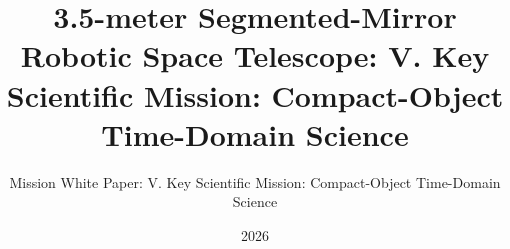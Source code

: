 \newcommand{\wpvolumelabel}{V}
\newcommand{\wpvolumetitle}{Key Scientific Mission: Compact-Object Time-Domain Science}
\title{3.5-meter Segmented-Mirror Robotic Space Telescope: \wpvolumelabel. \wpvolumetitle}
\subtitle{Mission White Paper: \wpvolumelabel. \wpvolumetitle}
\newcommand{\wpauthors}{Juhan Kim$^{1}$, Yong-Woo Kang$^{2}$, Sang Hyun Lee$^{2,3}$, Jeong-Yeol Han$^{2,4}$, Sungwook E. Hong$^{2,4}$, Bongkon Moon$^{2,4}$, Donguk Song$^{2}$, Juhyung Kang$^{2}$, Myeong-Gu Park$^{5}$, Sang Chul Kim$^{2,4}$, Chung-Uk Lee$^{2}$, Sangmo Tony Sohn$^{6}$, Arman Shafieloo$^{2,4}$, David Parkinson$^{2,4}$, Hong Soo Park$^{2,4}$, Dohyeong Kim$^{7}$, Chan Park$^{2}$, Jungjoo Sohn$^{8}$, Young-Beom Jeon$^{2}$, Jong-Hak Woo$^{9}$, Hyung Mok Lee$^{9}$, Hong Bae Ann$^{7}$, Myungkook James Jee$^{10}$, Mansoo Choi$^{2}$, Changbom Park$^{1}$}
\date{2026}
\newcommand{\wpabstract}{%
An isolated compact object retains the point-source resolving power of the space-based slitless spectrograph. The baseline wavelength range is $0.2$--$1.5\,\mu\mathrm{m}$. The planning baseline uses $R\simeq1000$ for broad and faint transient spectra and reserves selectable bands at $R\simeq5000$ for accretion-disk profiles, velocity structure, and precision line ratios. Broad features can be measured after binning the native $R\simeq5000$ data to lower resolution. Rapid-response spectroscopy follows gravitational-wave counterparts and kilonovae from hours to days. Repeated spectra of dwarf novae and compact binaries trace accretion state and orbital phase, while uninterrupted imaging of white dwarfs measures pulsation frequencies. The program combines mission-based monitoring with external alerts, including KGMT transient detections. The instrument study must preserve calibrated throughput to $2.70\,\mu\mathrm{m}$ and evaluate a $3.0\,\mu\mathrm{m}$ operational band edge, with $2.5\,\mu\mathrm{m}$ retained as the formal engineering off-ramp. Mid-infrared imaging is not part of the adopted compact-object baseline.
}
\newcommand{\wpkeywords}{\textbf{Keywords:} compact objects, time-domain astronomy, kilonovae, dwarf novae, white dwarfs, slitless spectroscopy}
\newcommand{\wpchapteroffset}{4}
\newcommand{\MakeVolumeBody}{%
  \definecolor{Blue1}{HTML}{D98A9A}%
  \definecolor{Blue2}{HTML}{B34F68}%
  \definecolor{Blue3}{HTML}{7A2944}%
  }
